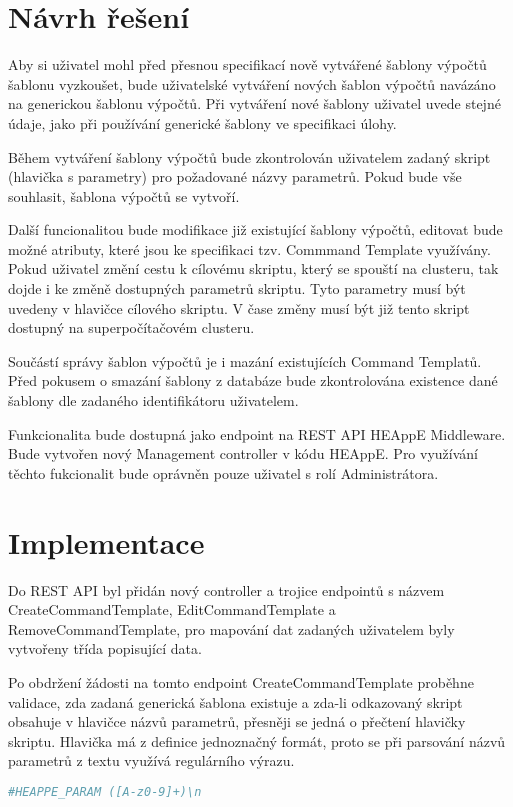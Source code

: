\section{Návrh řešení}
Aby si uživatel mohl před přesnou specifikací nově vytvářené šablony výpočtů šablonu vyzkoušet, bude uživatelské vytváření nových šablon výpočtů navázáno na generickou šablonu výpočtů. Při vytváření nové šablony uživatel uvede stejné údaje, jako při používání generické šablony ve specifikaci úlohy.

Během vytváření šablony výpočtů bude zkontrolován uživatelem zadaný skript (hlavička s parametry) pro požadované názvy parametrů. Pokud bude vše souhlasit, šablona výpočtů se vytvoří.

Další funcionalitou bude modifikace již existující šablony výpočtů, editovat bude možné atributy, které jsou ke specifikaci tzv. Commmand Template využívány. Pokud uživatel změní cestu k cílovému skriptu, který se spouští na clusteru, tak dojde i ke změně dostupných parametrů skriptu. Tyto parametry musí být uvedeny v hlavičce cílového skriptu. V čase změny musí být již tento skript dostupný na superpočítačovém clusteru.

Součástí správy šablon výpočtů je i mazání existujících Command Templatů. Před pokusem o smazání šablony z databáze bude zkontrolována existence dané šablony dle zadaného identifikátoru uživatelem.

Funkcionalita bude dostupná jako endpoint na REST API HEAppE Middleware. Bude vytvořen nový Management controller v kódu HEAppE. Pro využívání těchto fukcionalit bude oprávněn pouze uživatel s rolí Administrátora.

\section{Implementace}
Do REST API byl přidán nový controller a trojice endpointů s názvem CreateCommandTemplate, EditCommandTemplate a RemoveCommandTemplate, pro mapování dat zadaných uživatelem byly vytvořeny třída popisující data. 

Po obdržení žádosti na tomto endpoint CreateCommandTemplate proběhne validace, zda zadaná generická šablona existuje a zda-li odkazovaný skript obsahuje v hlavičce názvů parametrů, přesněji se jedná o přečtení hlavičky skriptu. Hlavička má z definice jednoznačný formát, proto se při parsování názvů parametrů z textu využívá regulárního výrazu.


\begin{lstlisting}[language=bash, caption={Regurální výraz pro parsování názvů parametrů}]
                                #HEAPPE_PARAM ([A-z0-9]+)\n
\end{lstlisting}

